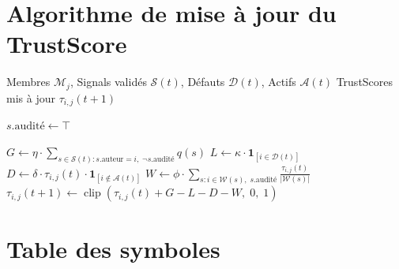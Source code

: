\documentclass[12pt,a4paper]{article}
\theoremstyle{definition}
\theoremstyle{plain}
\theoremstyle{remark}
\newcommand{\trustscore}{\tau}
\newcommand{\1}{\mathbf{1}}
\newcommand{\clip}{\operatorname{clip}}
\begin{document}
\appendix
\section{Algorithme de mise à jour du TrustScore}

\begin{algorithm}[H]
\caption{Mise à jour du TrustScore --- CTP v0.1}
\begin{algorithmic}[1]
\Require Membres $\mathcal{M}_j$, Signals validés $\mathcal{S}(t)$, Défauts $\mathcal{D}(t)$, Actifs $\mathcal{A}(t)$
\Ensure TrustScores mis à jour $\trustscore_{i,j}(t+1)$

    \State $s.\text{audité} \leftarrow \top$
  \EndIf
\EndFor

  \State $G \leftarrow \eta \cdot \sum_{s \in \mathcal{S}(t) : s.\text{auteur}=i,\; \neg s.\text{audité}} q(s)$
  \State $L \leftarrow \kappa \cdot \1_{[i \in \mathcal{D}(t)]}$
  \State $D \leftarrow \delta \cdot \trustscore_{i,j}(t) \cdot \1_{[i \notin \mathcal{A}(t)]}$
  \State $W \leftarrow \phi \cdot \sum_{s : i \in \mathcal{W}(s),\; s.\text{audité}} \frac{\trustscore_{i,j}(t)}{|\mathcal{W}(s)|}$
  \State $\trustscore_{i,j}(t+1) \leftarrow \clip(\trustscore_{i,j}(t) + G - L - D - W,\; 0,\; 1)$
\EndFor
\end{algorithmic}
\end{algorithm}

\section{Table des symboles}
\end{document}
